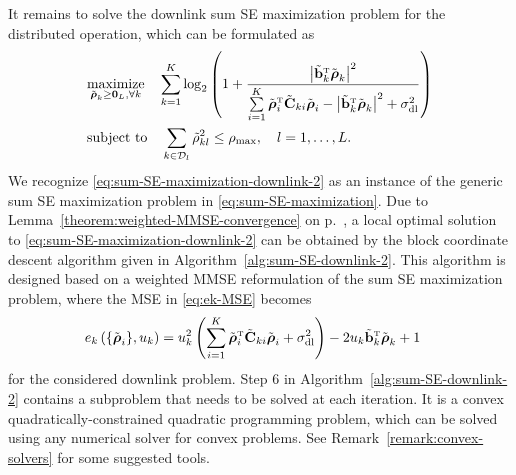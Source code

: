 It remains to solve the downlink sum SE maximization problem for the distributed operation, which  can be formulated as
\begin{align}\label{eq:sum-SE-maximization-downlink-2}
&\underset{\tilde{\boldsymbol{\rho}}_k \geq \vect{0}_L,\forall k}{\textrm{maximize}} \quad \sum\limits_{k=1}^K  \log_2\left(1+\frac{\left|\tilde{\vect{b}}_k^{\Ttran}\tilde{\boldsymbol{\rho}}_k\right|^2}{\sum\limits_{i=1}^K\tilde{\boldsymbol{\rho}}_i^{\Ttran}\tilde{\vect{C}}_{ki}\tilde{\boldsymbol{\rho}}_i-\left|\tilde{\vect{b}}_k^{\Ttran}\tilde{\boldsymbol{\rho}}_k\right|^2+\sigmaDL}\right) \\
&\textrm{subject to} \quad \sum_{k\in \mathcal{D}_l}\tilde{\rho}_{kl}^2\leq \rhomax, \quad l=1,\ldots,L.   \nonumber
\end{align}
We recognize \eqref{eq:sum-SE-maximization-downlink-2} as an instance of the generic sum SE maximization problem in \eqref{eq:sum-SE-maximization}. Due to Lemma~\ref{theorem:weighted-MMSE-convergence} on p.~\pageref{theorem:weighted-MMSE-convergence}, a local optimal solution to \eqref{eq:sum-SE-maximization-downlink-2} can be obtained by the block coordinate descent algorithm given in Algorithm~\ref{alg:sum-SE-downlink-2}. This algorithm is designed based on a weighted MMSE reformulation of the sum SE maximization problem, where the MSE in \eqref{eq:ek-MSE} becomes
\begin{align} 
&e_k\left(\{\tilde{\boldsymbol{\rho}}_i\}, u_k\right)=u_{k}^2\left(\sum\limits_{i=1}^K\tilde{\boldsymbol{\rho}}_i^{\Ttran}\tilde{\vect{C}}_{ki}\tilde{\boldsymbol{\rho}}_i+\sigmaDL\right) -2u_{k}\tilde{\vect{b}}_k^{\Ttran}\tilde{\boldsymbol{\rho}}_k+1  \label{eq:ek-MSE-downlink-2}
\end{align}
for the considered downlink problem. Step 6 in Algorithm~\ref{alg:sum-SE-downlink-2} contains a subproblem that needs to be solved at each iteration. It is a convex quadratically-constrained quadratic programming problem, which can be solved using any numerical solver for convex problems. See Remark~\ref{remark:convex-solvers} for some suggested tools.

